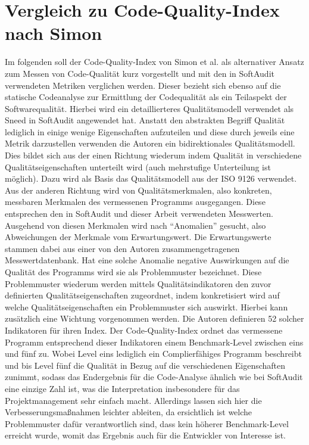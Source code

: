 \documentclass[gb,ngerman]{stthesis}
\begin{document}
		\section{Vergleich zu Code-Quality-Index nach Simon}
			Im folgenden soll der Code-Quality-Index von Simon et al. \cite{CodeQualityManagement} als alternativer Ansatz zum Messen von Code-Qualität kurz vorgestellt und mit den in SoftAudit verwendeten Metriken verglichen werden. Dieser bezieht sich ebenso auf die statische Codeanalyse zur Ermittlung der Codequalität als ein Teilaspekt der Softwarequalität. \newline
			Hierbei wird ein detaillierteres Qualitätsmodell verwendet als Sneed in SoftAudit angewendet hat. Anstatt den abstrakten Begriff Qualität lediglich in einige wenige Eigenschaften aufzuteilen und diese durch jeweils eine Metrik darzustellen verwenden die Autoren ein bidirektionales Qualitätsmodell. Dies bildet sich aus der einen Richtung wiederum indem Qualität in verschiedene Qualitätseigenschaften unterteilt wird (auch mehrstufige Unterteilung ist möglich). Dazu wird als Basis das Qualitätsmodell aus der ISO 9126 verwendet. Aus der anderen Richtung wird von Qualitätsmerkmalen, also konkreten, messbaren Merkmalen des vermessenen Programms ausgegangen. Diese entsprechen den in SoftAudit und dieser Arbeit verwendeten Messwerten. Ausgehend von diesen Merkmalen wird nach "`Anomalien"' gesucht, also Abweichungen der Merkmale vom Erwartungswert. Die Erwartungswerte stammen dabei aus einer von den Autoren zusammengetragenen Messwertdatenbank. Hat eine solche Anomalie negative Auswirkungen auf die Qualität des Programms wird sie als Problemmuster bezeichnet. Diese Problemmuster wiederum werden mittels Qualitätsindikatoren den zuvor definierten Qualitätseigenschaften zugeordnet, indem konkretisiert wird auf welche Qualitätseigenschaften ein Problemmuster sich auswirkt. Hierbei kann zusätzlich eine Wichtung vorgenommen werden. Die Autoren definieren 52 solcher Indikatoren für ihren Index. \newline
			Der Code-Quality-Index ordnet das vermessene Programm entsprechend dieser Indikatoren einem Benchmark-Level zwischen eins und fünf zu. Wobei Level eins lediglich ein Complierfähiges Programm beschreibt und bis Level fünf die Qualität in Bezug auf die verschiedenen Eigenschaften zunimmt, sodass das Endergebnis für die Code-Analyse ähnlich wie bei SoftAudit eine einzige Zahl ist, was die Interpretation insbesondere für das Projektmanagement sehr einfach macht. Allerdings lassen sich hier die Verbesserungsmaßnahmen leichter ableiten, da ersichtlich ist welche Problemmuster dafür verantwortlich sind, dass kein höherer Benchmark-Level erreicht wurde, womit das Ergebnis auch für die Entwickler von Interesse ist. \newline
\end{document}
